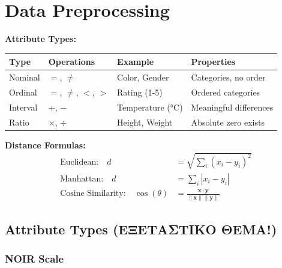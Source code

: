 
\chapter{Data Preprocessing}

\begin{formulabox}
\textbf{Attribute Types:}
\begin{center}
\begin{tabular}{lllp{5cm}}
\toprule
\textbf{Type} & \textbf{Operations} & \textbf{Example} & \textbf{Properties} \\
\midrule
Nominal & $=$, $\neq$ & Color, Gender & Categories, no order \\
Ordinal & $=$, $\neq$, $<$, $>$ & Rating (1-5) & Ordered categories \\
Interval & $+$, $-$ & Temperature (°C) & Meaningful differences \\
Ratio & $\times$, $\div$ & Height, Weight & Absolute zero exists \\
\bottomrule
\end{tabular}
\end{center}

\textbf{Distance Formulas:}
\begin{align*}
\text{Euclidean:} \quad d &= \sqrt{\sum_i (x_i - y_i)^2} \\
\text{Manhattan:} \quad d &= \sum_i |x_i - y_i| \\
\text{Cosine Similarity:} \quad \cos(\theta) &= \frac{\mathbf{x} \cdot \mathbf{y}}{\|\mathbf{x}\| \|\mathbf{y}\|}
\end{align*}
\end{formulabox}

\section{Attribute Types (ΕΞΕΤΑΣΤΙΚΟ ΘΕΜΑ!)}

\subsection{NOIR Scale}

